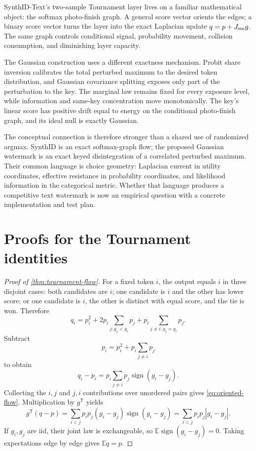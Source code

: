 \documentclass[11pt]{article}
\theoremstyle{definition}
\theoremstyle{remark}
\DeclareMathOperator{\sign}{sign}
\newcommand{\E}{\mathbb{E}}
\newcommand{\trans}{\mathsf{T}}
\begin{document}
SynthID-Text's two-sample Tournament layer lives on a familiar mathematical object: the softmax photo-finish graph. A general score vector orients the edges; a binary score vector turns the layer into the exact Laplacian update $q=p+J_{\rm sm}g$. The same graph controls conditional signal, probability movement, collision consumption, and diminishing layer capacity.

The Gaussian construction uses a different exactness mechanism. Probit share inversion calibrates the total perturbed maximum to the desired token distribution, and Gaussian covariance splitting exposes only part of the perturbation to the key. The marginal law remains fixed for every exposure level, while information and same-key concentration move monotonically. The key's linear score has positive drift equal to energy on the conditional photo-finish graph, and its ideal null is exactly Gaussian.

The conceptual connection is therefore stronger than a shared use of randomized argmax. SynthID is an exact softmax-graph flow; the proposed Gaussian watermark is an exact keyed disintegration of a correlated perturbed maximum. Their common language is choice geometry: Laplacian current in utility coordinates, effective resistance in probability coordinates, and likelihood information in the categorical metric. Whether that language produces a competitive text watermark is now an empirical question with a concrete implementation and test plan.

\appendix

\section{Proofs for the Tournament identities}
\label{app:tournament-proofs}

\begin{proof}[Proof of \cref{thm:tournament-flow}]
For a fixed token $i$, the output equals $i$ in three disjoint cases: both candidates are $i$; one candidate is $i$ and the other has lower score; or one candidate is $i$, the other is distinct with equal score, and the tie is won. Therefore
\begin{equation}
q_i
=p_i^2
+2p_i\sum_{j:g_j<g_i}p_j
+p_i\sum_{j\ne i:g_j=g_i}p_j.
\label{eq:qi-pair-accounting}
\end{equation}
Subtract
\begin{equation}
p_i=p_i^2+p_i\sum_{j\ne i}p_j
\end{equation}
to obtain
\begin{equation}
q_i-p_i
=p_i\sum_{j\ne i}p_j\sign(g_i-g_j).
\label{eq:coordinate-flow}
\end{equation}
Collecting the $i,j$ and $j,i$ contributions over unordered pairs gives \eqref{eq:oriented-flow}. Multiplication by $g^\trans$ yields
\begin{equation}
g^\trans(q-p)
=\sum_{i<j}p_i p_j(g_i-g_j)\sign(g_i-g_j)
=\sum_{i<j}p_i p_j|g_i-g_j|.
\end{equation}
If $g_i,g_j$ are iid, their joint law is exchangeable, so $\E\sign(g_i-g_j)=0$. Taking expectations edge by edge gives $\E q=p$.
\end{proof}
\end{document}
